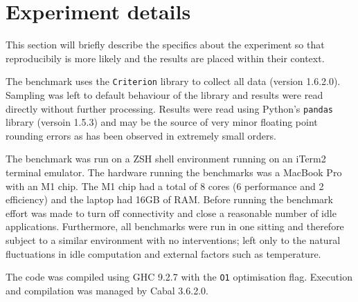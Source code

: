 \section{Experiment details}
This section will briefly describe the specifics about the experiment so that
reproducibily is more likely and the results are placed within their context.

The benchmark uses the \verb|Criterion| library to collect all data (version
1.6.2.0). Sampling was left to default behaviour of the library and results were
read directly without further processing. Results were read using Python's
\verb|pandas| library (versoin 1.5.3) and may be the source of very minor floating point
rounding errors as has been observed in extremely small orders.

The benchmark was run on a ZSH shell environment running on an iTerm2 terminal
emulator. The hardware running the benchmarks was a MacBook Pro with an M1 chip.
The M1 chip had a total of 8 cores (6 performance and 2 efficiency) and the
laptop had 16GB of RAM. Before running the benchmark effort was made to turn off
connectivity and close a reasonable number of idle applications. Furthermore,
all benchmarks were run in one sitting and therefore subject to a similar
environment with no interventions; left only to the natural fluctuations in idle
computation and external factors such as temperature.

The code was compiled using GHC 9.2.7 with the \verb|O1| optimisation flag.
Execution and compilation was managed by Cabal 3.6.2.0.
